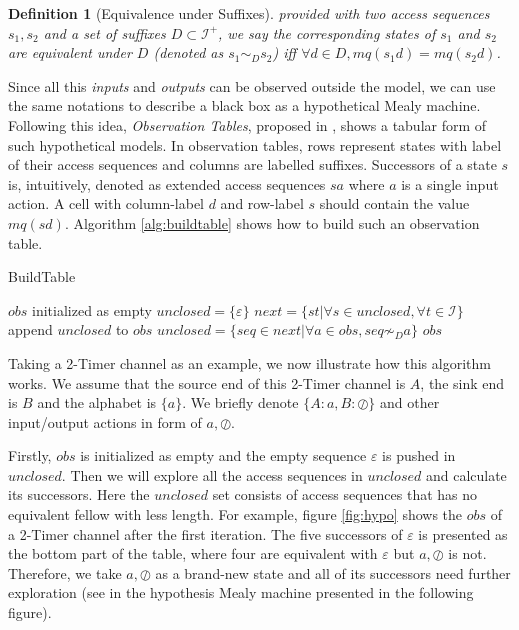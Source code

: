 \documentclass[conference, a4paper]{IEEEtran}
\newtheorem{definition}{Definition}
\newcommand{\rnoread}[0]{\oslash}
\begin{document}
\begin{definition}[Equivalence under Suffixes]
  provided with two access sequences $s_1,s_2$ and a set of suffixes $D\subset\mathcal{I}^+$, we say
  the corresponding states of $s_1$ and $s_2$ are equivalent under $D$ (denoted as $s_1\sim_D s_2$)
  iff $\forall d\in D, mq(s_1d) = mq(s_2d)$.
\end{definition}

Since all this \emph{inputs} and \emph{outputs} can be observed outside the
model, we can use the same notations to describe a black box as a hypothetical Mealy machine.
Following this idea, \emph{Observation Tables}, proposed in \cite{DBLP:journals/iandc/Angluin87},
shows a tabular form of such hypothetical models. In observation tables, rows represent states with
label of their access sequences and columns are labelled suffixes. Successors of a state $s$ is,
intuitively, denoted as extended access sequences $sa$ where $a$ is a single input action. 
A cell with column-label $d$ and row-label $s$ should contain the value $mq(sd)$. Algorithm
\ref{alg:buildtable} shows how to build such an observation table.

\begin{algorithm} 
  \caption{BuildTable} 
  \label{alg:buildtable}
  $obs$ initialized as empty\;
  $unclosed=\{\varepsilon\}$\;
  {
    $next=\{st|\forall s\in unclosed,\forall t\in \mathcal{I}\}$\;
    append $unclosed$ to $obs$\;
    $unclosed=\{seq\in next|\forall a\in obs, seq \not\sim_D a\}$\;
  }
  \Return $obs$\; 
\end{algorithm}

Taking a 2-Timer channel as an example, we now illustrate how this algorithm works. 
We assume that the source end of this 2-Timer channel is $A$, the sink end is $B$ and the alphabet
is $\{a\}$. We briefly denote $\{A:a,B:\rnoread\}$ and other input/output actions in form of
$a,\rnoread$.

Firstly, $obs$ is initialized as empty and the empty sequence $\varepsilon$ is pushed in $unclosed$.
Then we will explore all the access sequences in $unclosed$ and calculate its successors. Here the
$unclosed$ set consists of access sequences that has no equivalent fellow with less length. 
For example, figure \ref{fig:hypo} shows the $obs$ of a 2-Timer channel after the first
iteration. The five successors of $\varepsilon$ is presented as the bottom part of the table, where
four are equivalent with $\varepsilon$ but $a,\rnoread$ is not. Therefore, we take $a,\rnoread$ as a
brand-new state and all of its successors need further exploration (see in the hypothesis Mealy
machine presented in the following figure).
\end{document}
